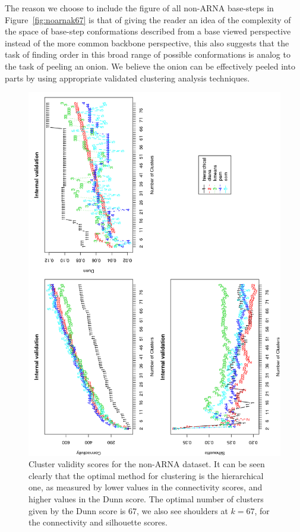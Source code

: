 The reason we choose to  include the figure of all non-ARNA base-steps
in Figure~\ref{fig:noarnak67} is that of  giving the reader an idea of
the complexity of the  space of base-step conformations described from
a  base  viewed  perspective  instead  of  the  more  common  backbone
perspective, this also suggests that the task of finding order in this
broad range of possible conformations is analog to the task of peeling
an onion. We believe the onion can be effectively peeled into parts by
using  appropriate validated clustering  analysis techniques.

\begin{figure}
 \centering
\includegraphics[angle=0, scale=0.8]{Chapter2/noarna_val.png}
\caption{Cluster validity  scores for the non-ARNA dataset.  It can be
  seen  clearly  that  the   optimal  method  for  clustering  is  the
  hierarchical one,  as measured by  lower values in  the connectivity
  scores, and higher  values in the Dunn score.  The optimal number of
  clusters given  by the Dunn  score is 67,  we also see  shoulders at
  $k=67$, for the connectivity and silhouette scores.}
 \label{fig:noarna}
\end{figure}

